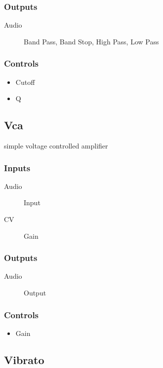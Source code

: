 \subsubsection{Outputs}
\begin{description}
\item [Audio] Band Pass, Band Stop, High Pass, Low Pass
\end{description}

\subsubsection{Controls}
\begin{itemize}
\item Cutoff
\item Q
\end{itemize}

\subsection{Vca}

simple voltage controlled amplifier



\subsubsection{Inputs}
\begin{description}
\item [Audio] Input
\item [CV] Gain
\end{description}

\subsubsection{Outputs}
\begin{description}
\item [Audio] Output
\end{description}

\subsubsection{Controls}
\begin{itemize}
\item Gain
\end{itemize}

\subsection{Vibrato}

